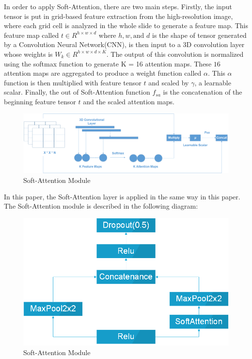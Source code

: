 \documentclass[sensors,article,submit,pdftex,moreauthors]{Definitions/mdpi}
\begin{document}
In order to apply Soft-Attention, there are two main steps. Firstly, the input tensor is put in grid-based feature extraction from the high-resolution image, where each grid cell is analyzed in the whole slide to generate a feature map\cite{08513}. This feature map called $t \in R^{h \times w \times d}$ where $h, w, \text{and } d$ is the shape of tensor generated by a Convolution Neural Network(CNN), is then input to a 3D convolution layer whose weights is $W_k \in R^{h \times w \times d \times K}$. The output of this convolution is normalized using the softmax function to generate K = 16 attention maps. These $16$ attention maps are aggregated to produce a weight function called $\alpha$. This $\alpha$ function is then multiplied with feature tensor $t$ and scaled by $\gamma$, a learnable scalar. Finally, the out of Soft-Attention function $f_{sa}$ is the concatenation of the beginning feature tensor $t$ and the scaled attention maps. 
\begin{figure}[h]
	\centering
	\includegraphics[width=1\linewidth]{Definitions/SoftAttention}
	\caption{Soft-Attention Module}
	\label{fig:softattention}
\end{figure}
In this paper, the Soft-Attention layer is applied in the same way in this paper\cite{03358}. The Soft-Attention module is described in the following diagram:
\FloatBarrier
\begin{figure}[h]
	\centering
	\includegraphics[width=0.5\linewidth]{Definitions/SoftAttentionBlock}
	\caption{Soft-Attention Module}
	\label{fig:softattentionblock}
\end{figure}
\FloatBarrier
\end{document}
